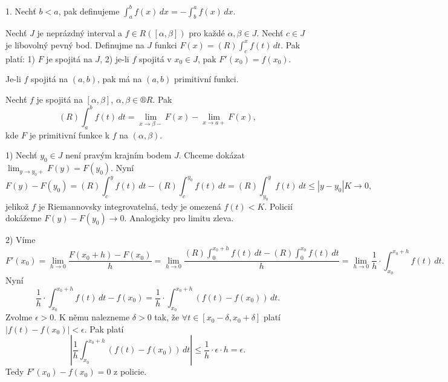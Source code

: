 \documentclass[12pt]{article}                   %
\begin{document}
        \begin{poznamka}[Úmluva]
            1. Nechť $b < a$, pak definujeme $\int_a^b f(x)\,dx = - \int_b^a f(x)\,dx$.
        \end{poznamka}

        \begin{veta}
            Nechť $J$ je neprázdný interval a $f \in R([\alpha, \beta])$ pro každé $\alpha, \beta \in J$. Nechť $c \in J$ je libovolný pevný bod. Definujme na $J$ funkci $F(x) = (R) \int_c^x f(t)\,dt$. Pak platí: 1) $F$ je spojitá na $J$, 2) je-li $f$ spojitá v $x_0 \in J$, pak $F'(x_0) = f(x_0)$.
        \end{veta}

        \begin{dusledek}
            Je-li $f$ spojitá na $(a, b)$, pak má na $(a, b)$ primitivní funkci.
        \end{dusledek}

        \begin{dusledek}
            Nechť $f$ je spojitá na $[\alpha, \beta]$, $\alpha, \beta \in ®R$. Pak
            $$ (R) \int_a^b f(t)\,dt = \lim_{x \rightarrow \beta-} F(x) - \lim_{x \rightarrow a+} F(x), $$ 
            kde $F$ je primitivní funkce k $f$ na $(\alpha, \beta)$.
        \end{dusledek}


        \begin{dukaz}
            1) Nechť $y_0 \in J$ není pravým krajním bodem $J$. Chceme dokázat $\lim_{y \rightarrow y_0+} F(y) = F(y_0)$. Nyní
            $$ F(y) - F(y_0) = (R) \int_c^y f(t)\,dt - (R)\int_c^{y_0} f(t)\,dt = (R)\int_{y_0}^y f(t)\,dt ≤ |y - y_0|K \rightarrow 0, $$
            jelikož $f$ je Riemannovsky integrovatelná, tedy je omezená $f(t) < K$. Policií dokážeme $F(y) - F(y_0) \rightarrow 0$. Analogicky pro limitu zleva.

            2) Víme 
            $$ F'(x_0) = \lim_{h \rightarrow 0} \frac{F(x_0 + h) - F(x_0)}{h} = \lim_{h \rightarrow 0} \frac{(R) \int_0^{x_0 + h} f(t)\,dt - (R)\int_0^{x_0} f(t)\,dt}{h} = \lim_{h \rightarrow 0} \frac{1}{h}·\int_{x_0}^{x_0 + h} f(t)\,dt. $$
            Nyní
            $$ \frac{1}{h}·\int_{x_0}^{x_0 + h} f(t)\,dt - f(x_0) = \frac{1}{h}·\int_{x_0}^{x_0 + h} (f(t) - f(x_0))\,dt. $$ 
            Zvolme $\epsilon > 0$. K němu nalezneme $\delta > 0$ tak, že $\forall t \in [x_0 - \delta, x_0 + \delta]$ platí $|f(t) - f(x_0)| < \epsilon$. Pak platí
            $$ \left|\frac{1}{h}\int_{x_0}^{x_0 + h} (f(t) - f(x_0))\,dt\right| ≤ \frac{1}{h}·\epsilon·h = \epsilon. $$
            Tedy $F'(x_0) - f(x_0) = 0$ z policie.
        \end{dukaz}
\end{document}
